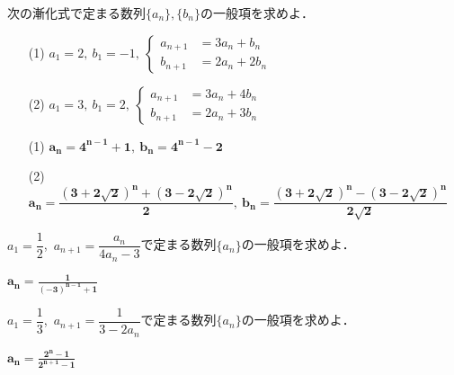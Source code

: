 \documentclass[a4paper,11pt]{ltjsarticle}
\begin{document}
\begin{toi}
    次の漸化式で定まる数列$\{a_n\},\{b_n\}$の一般項を求めよ．\\[5pt]
    \begin{minipage}{0.5\linewidth}
        \begin{itemize}
            \item [(1)]$\displaystyle{a_1=2,~b_1=-1,~\begin{cases}
      a_{n+1}&=3a_n+b_n\\
      b_{n+1}&=2a_n+2b_n
   \end{cases}}$   
        \end{itemize}
    \end{minipage}
    \begin{minipage}{0.5\linewidth}
         \begin{itemize}
            \item [(2)]$\displaystyle{a_1=3,~b_1=2,~\begin{cases}
      a_{n+1}&=3a_n+4b_n\\
      b_{n+1}&=2a_n+3b_n
   \end{cases}}$   
        \end{itemize}
    \end{minipage}
\end{toi}
\ans 
\begin{itemize}
    \item [(1)]$\boldsymbol{a_n=4^{n-1}+1,~b_n=4^{n-1}-2}$
    \item [(2)]$\boldsymbol{a_n=\dfrac{(3+2\sqrt{2})^n+(3-2\sqrt{2})^n}{2},~b_n=\dfrac{(3+2\sqrt{2})^n-(3-2\sqrt{2})^n}{2\sqrt{2}}}$
\end{itemize}
\begin{toi}
  $a_1=\dfrac12$,~$a_{n+1}=\dfrac{a_n}{4a_n-3}$で定まる数列$\{a_n\}$の一般項を求めよ．
\end{toi}
\ans $\displaystyle{\boldsymbol{a_n = \frac{1}{(-3)^{n-1}+1}}}$
\begin{toi}
  $a_1=\dfrac13$,~$a_{n+1}=\dfrac{1}{3-2a_n}$で定まる数列$\{a_n\}$の一般項を求めよ．
\end{toi}
\ans 
$\displaystyle{\boldsymbol{a_n = \frac{2^n-1}{2^{n+1}-1}}}$
\end{document}
